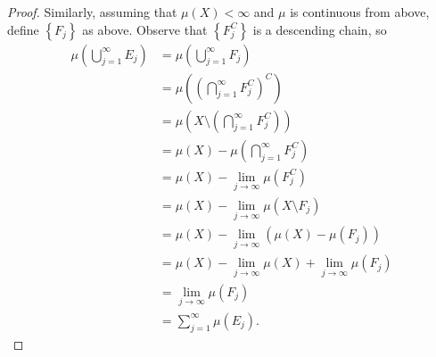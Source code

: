 \documentclass{article}
\theoremstyle{definition}
\begin{document}
\begin{proof}
	Similarly, assuming that $\mu(X) < \infty$ and $\mu$ is continuous from above, define $\left\lbrace F_j \right\rbrace$ as above.
	Observe that $\left\lbrace F_j^C \right\rbrace$ is a descending chain, so \begin{align*}
		\mu \left( \bigcup _{j = 1}^{\infty}E_j \right) & = \mu \left( \bigcup _{j = 1}^{\infty} F_j \right)                                 \\
		                                                & = \mu \left( \left( \bigcap _{j = 1}^{\infty} F_j^C \right)^C \right)              \\
		                                                & = \mu \left( X \setminus \left( \bigcap _{j = 1}^{\infty} F_j^C \right) \right)    \\
		                                                & = \mu \left( X \right) - \mu \left( \bigcap _{j = 1}^{\infty} F_j^C \right)        \\
		                                                & = \mu \left( X \right) - \lim_{j \to \infty} \mu(F_j^C)                            \\
		                                                & = \mu \left( X \right) - \lim_{j \to \infty} \mu(X \setminus F_j)                  \\
		                                                & = \mu \left( X \right) - \lim_{j \to \infty} (\mu(X) - \mu(F_j))                   \\
		                                                & = \mu \left( X \right) - \lim_{j \to \infty} \mu(X) + \lim_{j \to \infty} \mu(F_j) \\
		                                                & = \lim_{j \to \infty} \mu(F_j)                                                     \\
		                                                & = \sum _{j = 1}^{\infty} \mu \left( E_j \right).
	\end{align*}
\end{proof}
\end{document}
